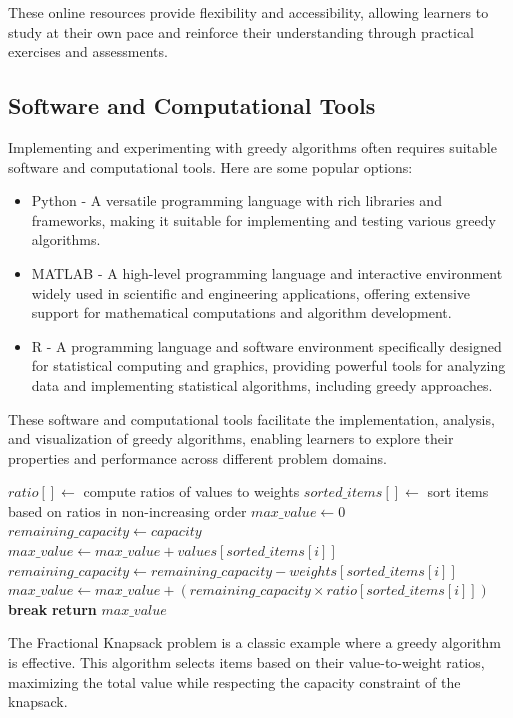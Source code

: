 \documentclass[12pt]{book} %
\begin{document}
These online resources provide flexibility and accessibility, allowing learners to study at their own pace and reinforce their understanding through practical exercises and assessments.

\subsection{Software and Computational Tools}
Implementing and experimenting with greedy algorithms often requires suitable software and computational tools. Here are some popular options:

\begin{itemize}
    \item Python - A versatile programming language with rich libraries and frameworks, making it suitable for implementing and testing various greedy algorithms.
    \item MATLAB - A high-level programming language and interactive environment widely used in scientific and engineering applications, offering extensive support for mathematical computations and algorithm development.
    \item R - A programming language and software environment specifically designed for statistical computing and graphics, providing powerful tools for analyzing data and implementing statistical algorithms, including greedy approaches.
\end{itemize}

These software and computational tools facilitate the implementation, analysis, and visualization of greedy algorithms, enabling learners to explore their properties and performance across different problem domains.

\FloatBarrier
\begin{algorithm}
\caption{Greedy Algorithm for Fractional Knapsack Problem}
\begin{algorithmic}[1]
\State $ratio[] \gets$ compute ratios of values to weights
\State $sorted\_items[] \gets$ sort items based on ratios in non-increasing order
\State $max\_value \gets 0$
\State $remaining\_capacity \gets capacity$
        \State $max\_value \gets max\_value + values[sorted\_items[i]]$
        \State $remaining\_capacity \gets remaining\_capacity - weights[sorted\_items[i]]$
    \Else
        \State $max\_value \gets max\_value + (remaining\_capacity \times ratio[sorted\_items[i]])$
        \State \textbf{break}
    \EndIf
\EndFor
\State \textbf{return} $max\_value$
\EndProcedure
\end{algorithmic}
\end{algorithm}
\FloatBarrier

The Fractional Knapsack problem is a classic example where a greedy algorithm is effective. This algorithm selects items based on their value-to-weight ratios, maximizing the total value while respecting the capacity constraint of the knapsack.
\end{document}
